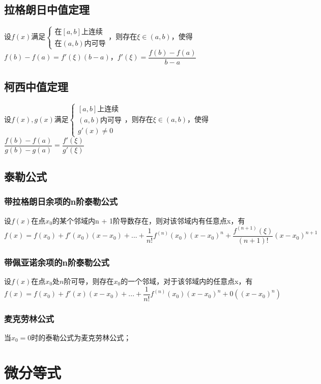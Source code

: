 \subsection{拉格朗日中值定理}
设\(f(x)\)满足\(\begin{cases}
\text{在}[a, b]\text{上连续} \\ 
\text{在}(a, b)\text{内可导}
\end{cases}\)，则存在\(\xi \in (a, b)\)，使得\(f(b) - f(a) = f'(\xi)(b - a)\)，\(f'(\xi) = \dfrac{f(b) - f(a)}{b - a}\)


\subsection{柯西中值定理}
设\(f(x), g(x)\)满足\(\begin{cases}
[a, b]\text{上连续} \\ 
(a, b)\text{内可导} \\ 
g'(x) \neq 0
\end{cases}\)，则存在\(\xi \in (a, b)\)，使得\(\dfrac{f(b) - f(a)}{g(b) - g(a)} = \dfrac{f'(\xi)}{g'(\xi)}\)


\subsection{泰勒公式}

\subsubsection{带拉格朗日余项的n阶泰勒公式}
设\(f(x)\)在点\(x_0\)的某个邻域内n + 1阶导数存在，则对该邻域内有任意点x，有\[f(x) = f(x_0) + f'(x_0)(x - x_0) + ... + \dfrac{1}{n!}f^{(n)}(x_0)(x - x_0)^n + \dfrac{f^{(n + 1)}(\xi)}{(n + 1)!}(x - x_0)^{n + 1}\]

\subsubsection{带佩亚诺余项的n阶泰勒公式}
设\(f(x)\)在点\(x_0\)处\(n\)阶可导，则存在\(x_0\)的一个邻域，对于该邻域内的任意点x，有\[f(x) = f(x_0) + f'(x)(x - x_0) + ... + \dfrac{1}{n!}f^{(n)}(x_0)(x - x_0)^n + 0((x - x_0)^n)\]

\subsubsection{麦克劳林公式}
当\(x_0 = 0\)时的泰勒公式为麦克劳林公式；


\section{微分等式}

